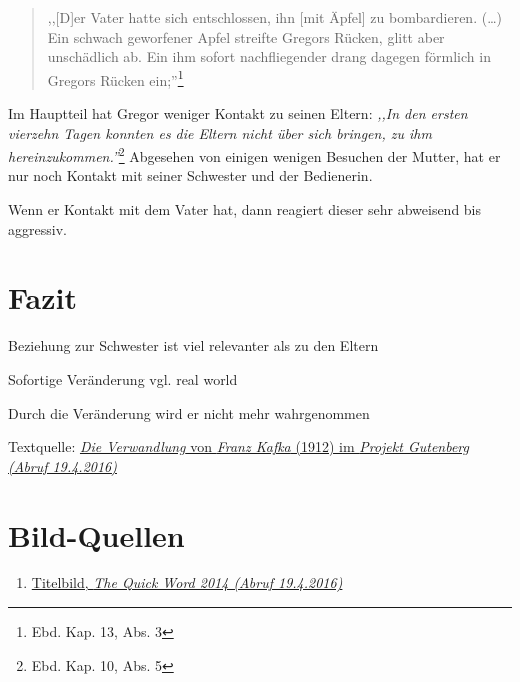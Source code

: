 \documentclass[12pt,a4paper,twoside,titlepage]{article}
\let\oldsection\section
\renewcommand\section{\clearpage\oldsection}
\begin{document}
	\begin{quote}
		,,[D]er Vater hatte sich entschlossen, ihn [mit Äpfel] zu bombardieren. (\dots) Ein schwach geworfener Apfel streifte Gregors Rücken, glitt aber unschädlich ab. Ein ihm sofort nachfliegender drang dagegen förmlich in Gregors Rücken ein;''\footnote{Ebd. Kap. 13, Abs. 3}
	\end{quote}
	
	
	
	Im Hauptteil hat Gregor weniger Kontakt zu seinen Eltern: \textit{,,In den ersten vierzehn Tagen konnten es die Eltern nicht über sich bringen, zu ihm hereinzukommen.''}\footnote{Ebd. Kap. 10, Abs. 5} Abgesehen von einigen wenigen Besuchen der Mutter, hat er nur noch Kontakt mit seiner Schwester und der Bedienerin.
	
	Wenn er Kontakt mit dem Vater hat, dann reagiert dieser sehr abweisend bis aggressiv.
	
	
	
	\section{Fazit}
	
	Beziehung zur Schwester ist viel relevanter als zu den Eltern
	
	Sofortige Veränderung vgl. real world
	
	Durch die Veränderung wird er nicht mehr wahrgenommen 
	
	
	\begin{thebibliography}{9}
		 Textquelle: \href{http://gutenberg.spiegel.de/buch/die-verwandlung-165/1}{\textit{Die Verwandlung} von \textit{Franz Kafka} (1912) im \textit{Projekt Gutenberg (Abruf 19.4.2016)}}
		
%			
	\end{thebibliography}
	
	\appendix
	
	\section{Bild-Quellen}
	\begin{enumerate}
		\item \label{qui14} \href{https://thequickword.wordpress.com/2014/01/28/dyslexicatheist-book-review-franz-kafka-the-metamorphosis-die-verwandlung/}{Titelbild, \textit{The Quick Word 2014 (Abruf 19.4.2016)}}
	\end{enumerate}
	
	
	
	
\end{document}
